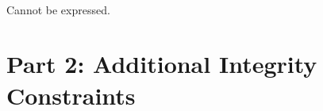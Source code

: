 \documentclass{article}
\begin{document}
\begin{enumerate}
{~}\\ %
{\large %
Cannot be expressed. \\[10pt]
} %

\end{enumerate}






\newpage
\section*{Part 2: Additional Integrity Constraints}
\end{document}
